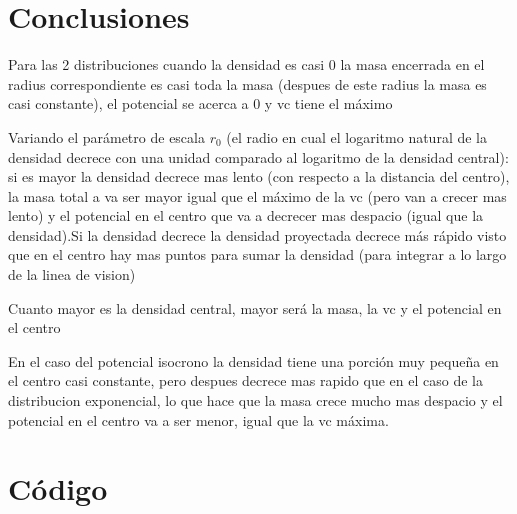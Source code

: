 \documentclass[12pt]{book}
\begin{document}
\section*{Conclusiones}
\begin{description}
\item Para las 2 distribuciones cuando la densidad es casi 0 la masa encerrada en el radius correspondiente es casi toda la masa (despues de este radius la masa es casi constante), el potencial se acerca a 0 y vc tiene el máximo
\item Variando el parámetro de escala $r_0$ (el radio en cual el logaritmo natural de la densidad decrece con una unidad comparado al logaritmo de la densidad central): si es mayor la densidad decrece mas lento (con respecto a la distancia del centro), la masa total  a va ser mayor igual que el máximo de la vc (pero van a crecer mas lento) y el potencial en el centro que va a decrecer mas despacio (igual que la densidad).Si la densidad decrece la densidad proyectada decrece más rápido visto que en el centro hay mas puntos para sumar la densidad (para integrar a lo largo de la linea de vision)
\item Cuanto mayor es la densidad central, mayor será la masa, la vc  y el potencial en el centro
\item En el caso del potencial isocrono la densidad tiene una porción muy pequeña en el centro casi constante, pero despues decrece mas rapido que en el caso de la distribucion exponencial, lo que hace que la masa crece mucho mas despacio y el potencial en el centro va a ser menor, igual que la vc máxima.
\end{description}


\clearpage

\section*{Código}
\end{document}
